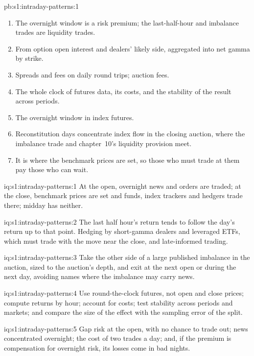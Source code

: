 \begin{solution}{pb:s1:intraday-patterns:1}
\begin{enumerate}
\item The overnight window is a risk premium; the last-half-hour and imbalance trades are liquidity trades.
\item From option open interest and dealers' likely side, aggregated into net gamma by strike.
\item Spreads and fees on daily round trips; auction fees.
\item The whole clock of futures data, its costs, and the stability of the result across periods.
\item The overnight window in index futures.
\item Reconstitution days concentrate index flow in the closing auction, where the imbalance trade and chapter~10's liquidity provision meet.
\item It is where the benchmark prices are set, so those who must trade at them pay those who can wait.
\end{enumerate}
\end{solution}

\begin{solution}{iq:s1:intraday-patterns:1}
At the open, overnight news and orders are traded; at the close, benchmark prices are set and funds, index trackers and hedgers trade there; midday has
neither.
\end{solution}

\begin{solution}{iq:s1:intraday-patterns:2}
The last half hour's return tends to follow the day's return up to that point. Hedging by short-gamma dealers and leveraged ETFs, which must trade with the
move near the close, and late-informed trading.
\end{solution}

\begin{solution}{iq:s1:intraday-patterns:3}
Take the other side of a large published imbalance in the auction, sized to the auction's depth, and exit at the next open or during the next day, avoiding
names where the imbalance may carry news.
\end{solution}

\begin{solution}{iq:s1:intraday-patterns:4}
Use round-the-clock futures, not open and close prices; compute returns by hour; account for costs; test stability across periods and markets; and compare
the size of the effect with the sampling error of the split.
\end{solution}

\begin{solution}{iq:s1:intraday-patterns:5}
Gap risk at the open, with no chance to trade out; news concentrated overnight; the cost of two trades a day; and, if the premium is compensation for
overnight risk, its losses come in bad nights.
\end{solution}

